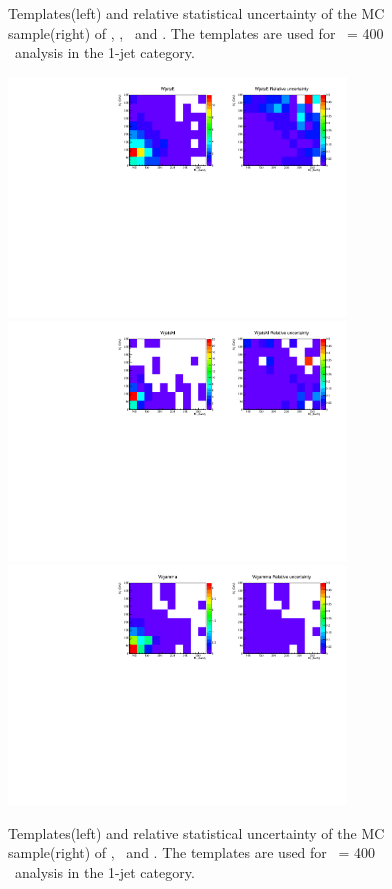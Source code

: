\begin{figure}[htp]
\caption{Templates(left) and relative statistical uncertainty of the MC sample(right) 
of \qqww, \ggww, \topbkg\ and \vv. 
The templates are used for \mHi\ = 400 \GeV\ analysis in the 1-jet category.}
\label{fig:2dtemplate_400_1j_2}
\end{figure}

\begin{figure}[htp]
\centering
\includegraphics[width=0.8\textwidth]{figures/2dtemplate_WjetsE_mH400_1j.pdf}
\includegraphics[width=0.8\textwidth]{figures/2dtemplate_WjetsM_mH400_1j.pdf}
\includegraphics[width=0.8\textwidth]{figures/2dtemplate_Wgamma_mH400_1j.pdf}
\caption{Templates(left) and relative statistical uncertainty of the MC sample(right) 
of \WjetsE, \WjetsM\ and \wgamma. 
The templates are used for \mHi\ = 400 \GeV\ analysis in the 1-jet category.}
\label{fig:2dtemplate_400_1j_3}
\end{figure}

